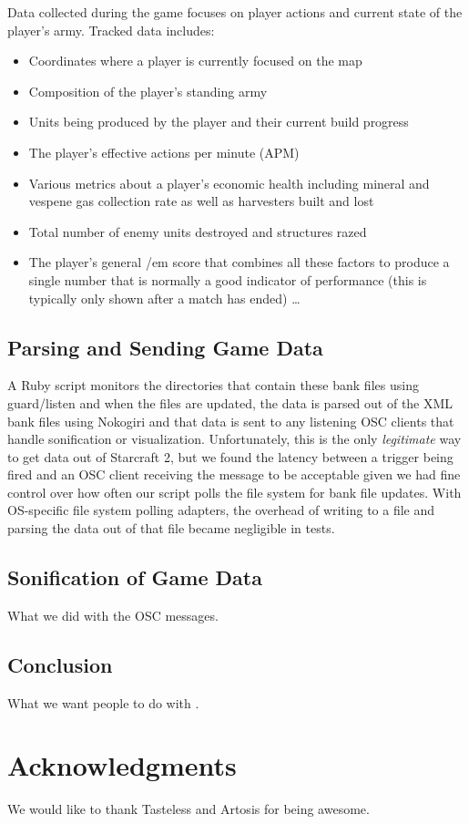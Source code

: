 \documentclass{nime-document-class}
\begin{document}
Data collected during the game focuses on player actions and current state of the player's army.
Tracked data includes:
\begin{itemize} \itemsep1pt \parskip0pt 
  \item Coordinates where a player is currently focused on the map
  \item Composition of the player's standing army
  \item Units being produced by the player and their current build progress
  \item The player's effective actions per minute (APM)
  \item Various metrics about a player's economic health including mineral and vespene gas collection rate as well as harvesters built and lost
  \item Total number of enemy units destroyed and structures razed
  \item The player's general {/em score} that combines all these factors to produce a single number that is normally a good indicator of performance (this is typically only shown after a match has ended) \ldots
\end{itemize}

\subsection{Parsing and Sending Game Data}
A Ruby script monitors the directories that contain these bank files using guard/listen and when the files are updated, the data is parsed out of the XML bank files using Nokogiri and that data is sent to any listening OSC clients that handle sonification or visualization.
Unfortunately, this is the only {\em legitimate} way to get data out of Starcraft 2, but we found the latency between a trigger being fired and an OSC client receiving the message to be acceptable given we had fine control over how often our script polls the file system for bank file updates.
With OS-specific file system polling adapters, the overhead of writing to a file and parsing the data out of that file became negligible in tests.

\subsection{Sonification of Game Data}
What we did with the OSC messages.

\subsection{Conclusion}
What we want people to do with \projectName{}.

\section{Acknowledgments}
We would like to thank Tasteless and Artosis for being awesome.

\end{document}
